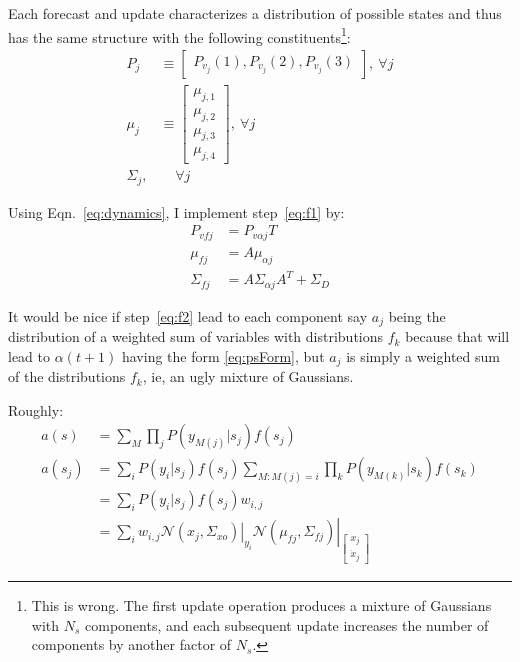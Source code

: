 \documentclass[12pt]{article}
\newcommand{\NormalE}[3]{{\mathcal{N}}\left.\left(#1,#2\right)\right|_{#3}}
\newcommand{\xdot}{{\dot x}}
\begin{document}
Each forecast and update characterizes a distribution of possible
states and thus has the same structure with the following
constituents\footnote{This is wrong.  The first update operation
  produces a mixture of Gaussians with $N_s$ components, and each
  subsequent update increases the number of components by another
  factor of $N_s$.}:
\begin{subequations}
  \label{eq:psForm}
  \begin{align}
    P_j &\equiv \begin{bmatrix} P_{v_j}(1), P_{v_j}(2), P_{v_j}(3)
    \end{bmatrix}, ~\forall j\\
    \mu_j &\equiv \begin{bmatrix} \mu_{j,1} \\ \mu_{j,2} \\ \mu_{j,3} \\
      \mu_{j,4} \end{bmatrix}, ~\forall j\\
    \Sigma_j, &~~~~~\forall j
  \end{align}
\end{subequations}

Using Eqn.~\eqref{eq:dynamics}, I implement step~\eqref{eq:f1} by:
\begin{subequations}
  \label{eq:f1I}
  \begin{align}
    P_{vfj} &= P_{v\alpha j} T\\
    \mu_{fj} &= A \mu_{\alpha j}\\
    \Sigma_{fj} &= A \Sigma_{\alpha j} A^T + \Sigma_D
  \end{align}
\end{subequations}

It would be nice if step~\eqref{eq:f2} lead to each component say
$a_j$ being the distribution of a weighted sum of variables with
distributions $f_k$ because that will lead to $\alpha(t+1)$ having the
form \eqref{eq:psForm}, but $a_j$ is simply a weighted sum of the
distributions $f_k$, ie, an ugly mixture of Gaussians.

Roughly:
\begin{align*}
  a(s) &= \sum_M \prod_j P(y_{M(j)}|s_j) f(s_j) \\
  a(s_j) &= \sum_i  P(y_i|s_j) f(s_j) \sum_{M:M(j)=i}  \prod_k
  P(y_{M(k)}|s_k) f(s_k)\\
  &= \sum_i  P(y_i|s_j) f(s_j) w_{i,j} \\
  &= \sum_i  w_{i,j} \NormalE{x_j}{\Sigma_{xo}}{y_i}
  \NormalE{\mu_{fj}}{\Sigma_{fj}}{\begin{bmatrix} x_j\\ \xdot_j
    \end{bmatrix}}
\end{align*}
\end{document}
